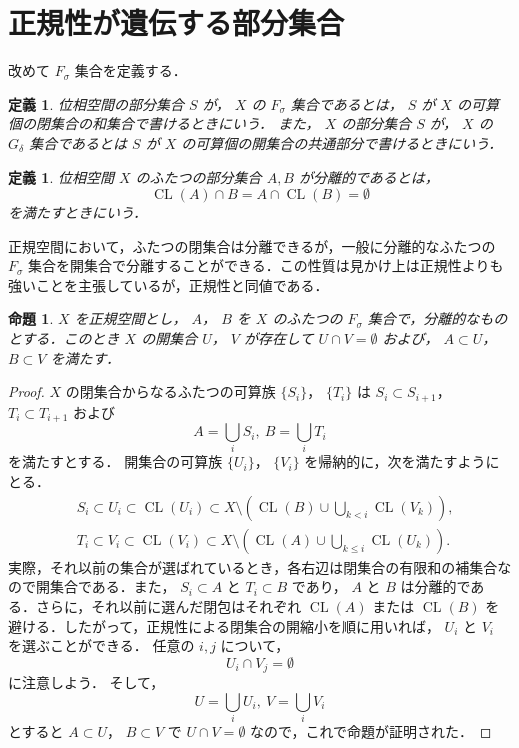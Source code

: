 \documentclass[leqno, 12pt]{ltjsarticle}
\newtheorem{prop}[thm]{命題}
\newtheorem{df}[thm]{定義}
\DeclareMathOperator{\cl}{CL}
\begin{document}
\section{正規性が遺伝する部分集合}\label{sec:iden}
改めて
$F_{\sigma}$
集合を定義する．
\begin{df}
位相空間の部分集合
$S$
が，
$X$
の
$F_{\sigma}$
集合であるとは，
$S$
が
$X$
の可算個の閉集合の和集合で書けるときにいう．
また，
$X$
の部分集合
$S$
が，
$X$
の
$G_{\delta}$
集合であるとは
$S$
が
$X$
の可算個の開集合の共通部分で書けるときにいう．
\end{df}
\begin{df}
位相空間
$X$
のふたつの部分集合
$A,B$
が分離的であるとは，
\[
\cl(A)\cap B=A\cap \cl(B)=\emptyset
\]
を満たすときにいう．
\end{df}
正規空間において，ふたつの閉集合は分離できるが，一般に分離的なふたつの
$F_{\sigma}$
集合を開集合で分離することができる．この性質は見かけ上は正規性よりも強いことを主張しているが，正規性と同値である．
\begin{prop}\label{efsigma}
$X$
を正規空間とし，
$A$，
$B$
を
$X$
のふたつの
$F_{\sigma}$
集合で，分離的なものとする．このとき
$X$
の開集合
$U$，
$V$
が存在して
$U\cap V=\emptyset$
および，
$A\subset U$，
$B\subset V$
を満たす．
\end{prop}
\begin{proof}
$X$
の閉集合からなるふたつの可算族
$\{S_{i}\}$，
$\{T_{i}\}$
は
$S_{i}\subset S_{i+1}$，
$T_{i}\subset T_{i+1}$
および
\[
A=\bigcup_{i} S_{i}, \ B=\bigcup_{i} T_{i}
\]
を満たすとする．
開集合の可算族
$\{U_{i}\}$，
$\{V_{i}\}$
を帰納的に，次を満たすようにとる．
\setcounter{equation}{0}
\begin{align*}
&S_{i}\subset U_{i}\subset \cl(U_{i})\subset X\setminus(\cl(B)\cup \bigcup_{k<i}\cl(V_{k})), \\
&T_{i} \subset V_{i}\subset \cl(V_{i})\subset X\setminus(\cl(A)\cup \bigcup_{k\le i}\cl(U_{k})).
\end{align*}
実際，それ以前の集合が選ばれているとき，各右辺は閉集合の有限和の補集合なので開集合である．また，
$S_{i}\subset A$
と
$T_{i}\subset B$
であり，
$A$
と
$B$
は分離的である．さらに，それ以前に選んだ閉包はそれぞれ
$\cl(A)$
または
$\cl(B)$
を避ける．したがって，正規性による閉集合の開縮小を順に用いれば，
$U_{i}$
と
$V_{i}$
を選ぶことができる．
任意の
$i,j$
について，
\[
U_{i}\cap V_{j}=\emptyset
\]
に注意しよう．
そして，
\[
U=\bigcup_{i}U_{i}, \ V=\bigcup_{i}V_{i}
\]
とすると
$A\subset U$，
$B\subset V$
で
$U\cap V=\emptyset$
なので，これで命題が証明された．
\end{proof}
\end{document}
